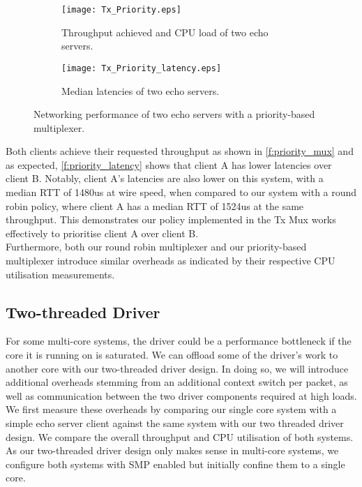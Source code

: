 \noindent\begin{figure}[h]
    \centering
	\begin{multicols}{2}
		\begin{subfigure}[b]{0.45\textwidth}
        \centering
        \texttt{[image: Tx\_Priority.eps]}
        \caption{Throughput achieved and CPU load of two echo servers.}
        \label{f:priority_mux}
    \end{subfigure}\qquad
    \begin{subfigure}[b]{0.45\textwidth}
        \vspace{52pt}
        \centering
        \texttt{[image: Tx\_Priority\_latency.eps]}
        \vspace{0.5pt}
        \caption{Median latencies of two echo servers.}
        \label{f:priority_latency}
    \end{subfigure}
\end{multicols}
\caption{Networking performance of two echo servers with a priority-based multiplexer.}
\end{figure}

Both clients achieve their requested throughput as shown in \autoref{f:priority_mux} and as expected, \autoref{f:priority_latency} shows
that client A has lower latencies over client B. Notably, client A's latencies are also lower on this system, with a median RTT
of 1480us at wire speed, when compared to our system with a round robin policy, where client A has a median RTT of 1524us at the same
throughput. This demonstrates our policy implemented in the Tx Mux works effectively to prioritise
client A over client B.\\
Furthermore, both our round robin multiplexer and our priority-based multiplexer introduce similar overheads as indicated by their 
respective CPU utilisation measurements. \\

\subsection{Two-threaded Driver}
For some multi-core systems, the driver could be a performance bottleneck if the core it is running on is saturated. We can offload
some of the driver's work to another core with our two-threaded driver design. In doing so, we will introduce additional overheads
stemming from an additional context switch per packet, as well as communication between the two driver components required at
high loads. We first measure these overheads by comparing our single core system with a simple echo server client against the 
same system with our two threaded driver design. We compare the overall throughput and CPU utilisation of both systems. As 
our two-threaded driver design only makes sense in multi-core systems, we configure both systems with SMP enabled but 
initially confine them to a single core.

